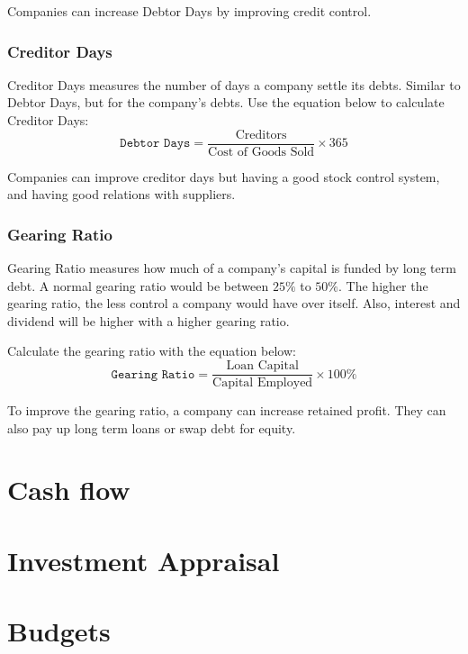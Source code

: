 \documentclass{standalone}
\begin{document}
Companies can increase Debtor Days by improving credit control.

\subsubsection{Creditor Days}
Creditor Days measures the number of days a company settle its debts.
Similar to Debtor Days, but for the company's debts.
Use the equation below to calculate Creditor Days:
\begin{equation}
    \texttt{Debtor Days} = \frac{\textrm{Creditors}}{\textrm{Cost of Goods Sold}} \times 365
\end{equation}

Companies can improve creditor days but having a good stock control system, and having good relations with suppliers.

\subsubsection{Gearing Ratio}
Gearing Ratio measures how much of a company's capital is funded by long term debt.
A normal gearing ratio would be between $25\%$ to $50\%$.
The higher the gearing ratio, the less control a company would have over itself.
Also, interest and dividend will be higher with a higher gearing ratio.

Calculate the gearing ratio with the equation below:
\begin{equation}
    \texttt{Gearing Ratio} = \frac{\textrm{Loan Capital}}{\textrm{Capital Employed}} \times 100\%
\end{equation}

To improve the gearing ratio, a company can increase retained profit.
They can also pay up long term loans or swap debt for equity.

\section{Cash flow}

\section{Investment Appraisal}

\section{Budgets}
\end{document}

